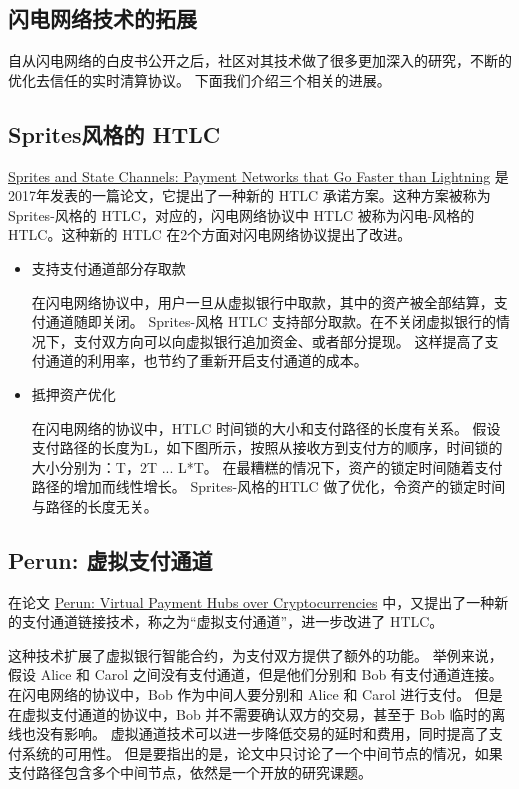 \begin{appendices}
\section{闪电网络技术的拓展}
自从闪电网络的白皮书公开之后，社区对其技术做了很多更加深入的研究，不断的优化去信任的实时清算协议。
下面我们介绍三个相关的进展。

\subsection{Sprites风格的 HTLC}
\href{https://arxiv.org/abs/1702.05812}{Sprites and State Channels: Payment Networks that Go Faster than Lightning} 是2017年发表的一篇论文，它提出了一种新的 HTLC 承诺方案。这种方案被称为 Sprites-风格的 HTLC，对应的，闪电网络协议中 HTLC 被称为闪电-风格的HTLC。这种新的 HTLC 在2个方面对闪电网络协议提出了改进。

\begin{itemize}
    \item 支持支付通道部分存取款

    在闪电网络协议中，用户一旦从虚拟银行中取款，其中的资产被全部结算，支付通道随即关闭。
    Sprites-风格 HTLC 支持部分取款。在不关闭虚拟银行的情况下，支付双方向可以向虚拟银行追加资金、或者部分提现。
    这样提高了支付通道的利用率，也节约了重新开启支付通道的成本。

    \item 抵押资产优化

    在闪电网络的协议中，HTLC 时间锁的大小和支付路径的长度有关系。
    假设支付路径的长度为L，如下图所示，按照从接收方到支付方的顺序，时间锁的大小分别为：T，2T ... L*T。
    在最糟糕的情况下，资产的锁定时间随着支付路径的增加而线性增长。
    Sprites-风格的HTLC 做了优化，令资产的锁定时间与路径的长度无关。
\end{itemize}

\subsection{Perun: 虚拟支付通道}
在论文 \href{https://eprint.iacr.org/2017/635.pdf}{Perun: Virtual Payment Hubs over Cryptocurrencies} 中，又提出了一种新的支付通道链接技术，称之为“虚拟支付通道”，进一步改进了 HTLC。

这种技术扩展了虚拟银行智能合约，为支付双方提供了额外的功能。
举例来说，假设 Alice 和 Carol 之间没有支付通道，但是他们分别和 Bob 有支付通道连接。
在闪电网络的协议中，Bob 作为中间人要分别和 Alice 和 Carol 进行支付。
但是在虚拟支付通道的协议中，Bob 并不需要确认双方的交易，甚至于 Bob 临时的离线也没有影响。
虚拟通道技术可以进一步降低交易的延时和费用，同时提高了支付系统的可用性。
但是要指出的是，论文中只讨论了一个中间节点的情况，如果支付路径包含多个中间节点，依然是一个开放的研究课题。


\end{appendices}
